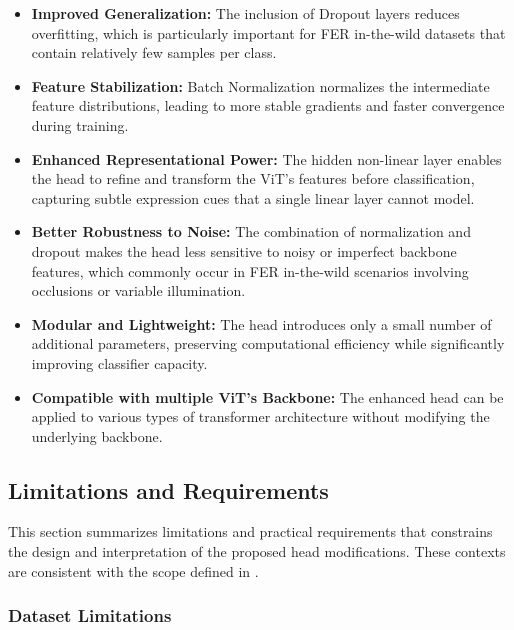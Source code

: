 \begin{itemize}
    \item \textbf{Improved Generalization:} The inclusion of Dropout layers reduces overfitting, which is particularly important for \gls{FER} \gls{in-the-wild} datasets that contain relatively few samples per class.

    \item \textbf{Feature Stabilization:} Batch Normalization normalizes the intermediate feature distributions, leading to more stable gradients and faster convergence during training.

    \item \textbf{Enhanced Representational Power:} The hidden non-linear layer enables the head to refine and transform the ViT's features before classification, capturing subtle expression cues that a single linear layer cannot model.

    \item \textbf{Better Robustness to Noise:} The combination of normalization and dropout makes the head less sensitive to noisy or imperfect backbone features, which commonly occur in \gls{FER} \gls{in-the-wild} scenarios involving occlusions or variable illumination.

    \item \textbf{Modular and Lightweight:} The head introduces only a small number of additional parameters, preserving computational efficiency while significantly improving classifier capacity.

    \item \textbf{Compatible with multiple ViT's Backbone:} The enhanced head can be applied to various types of transformer architecture without modifying the underlying backbone.
    
    
\end{itemize}


\subsection{Limitations and Requirements}

This section summarizes limitations and practical requirements that constrains the design and interpretation of the proposed head modifications. These contexts are consistent with the scope defined in . 

\subsubsection{Dataset Limitations}

